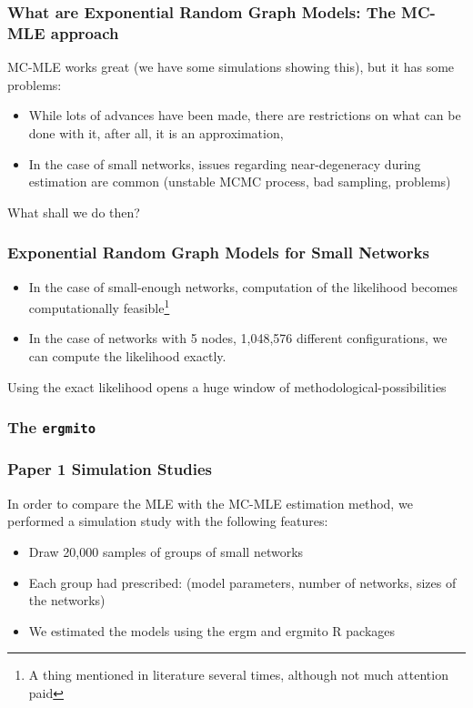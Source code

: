\documentclass[aspectratio=169, 10pt]{beamer}
\newcommand{\ergmitopkg}[0]{\texttt{ergmito}}
\begin{document}
\begin{frame}
\frametitle{What are Exponential Random Graph Models: The MC-MLE approach}

MC-MLE works great (we have some simulations showing this), but it has some
problems:

\begin{itemize}
\item While lots of advances have been made, there are restrictions on what can
be done with it, after all, it is an approximation,
\item In the case of small networks, issues regarding near-degeneracy during
estimation are common (unstable MCMC process, bad sampling, problems)
\end{itemize}

What shall we do then?

\end{frame}

\begin{frame}
\frametitle{Exponential Random Graph Models for Small Networks}

\begin{itemize}
\item In the case of small-enough networks, computation of the likelihood becomes
computationally feasible\footnote{A thing mentioned in literature several times, although not much attention paid}
\item In the case of networks with 5 nodes, 1,048,576
different configurations, we can compute the likelihood exactly.
\end{itemize}

Using the exact likelihood opens a huge window of methodological-possibilities
\end{frame}

\begin{frame}
\frametitle{The \ergmitopkg{}}



\end{frame}

\begin{frame}
\frametitle{Paper 1 Simulation Studies}

In order to compare the MLE with the MC-MLE estimation method, we performed a simulation study with the following features:

\begin{itemize}
\item Draw 20,000 samples of groups of small networks
\item Each group had prescribed: (model parameters, number of networks, sizes of the networks)
\item We estimated the models using the ergm and ergmito R packages
\end{itemize}

\end{frame}
\end{document}
